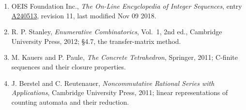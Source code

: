 \documentclass[11pt]{article}
\theoremstyle{definition}
\begin{document}
\begin{enumerate}

\item OEIS Foundation Inc., \emph{The On-Line Encyclopedia of Integer Sequences}, entry \href{https://oeis.org/A240513}{A240513}, revision 11, last modified Nov 09 2018.

\item R. P. Stanley, \emph{Enumerative Combinatorics}, Vol.~1, 2nd ed., Cambridge University Press, 2012; \S4.7, the transfer-matrix method.

\item M. Kauers and P. Paule, \emph{The Concrete Tetrahedron}, Springer, 2011; C-finite sequences and their closure properties.

\item J. Berstel and C. Reutenauer, \emph{Noncommutative Rational Series with Applications}, Cambridge University Press, 2011; linear representations of counting automata and their reduction.

\end{enumerate}
\end{document}
